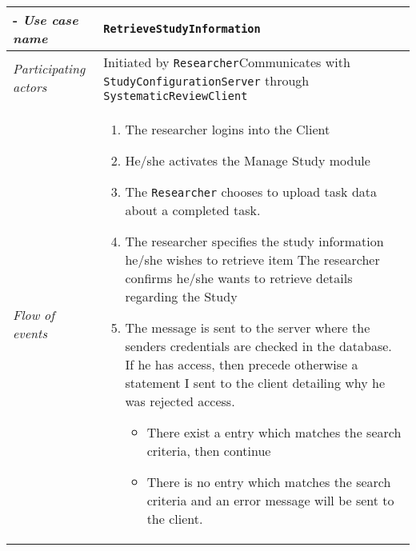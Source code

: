 
%
%
\newcommand{\client}{\texttt{SystematicReviewClient}\xspace}
\newcommand{\server}{\texttt{StudyConfigurationServer}\xspace}
\newcommand{\studyconfigui}{\texttt{StudyConfigurationUI}\xspace}
\newcommand{\teammanagement}{\texttt{Team Management}\xspace}
\newcommand{\researcher}{\texttt{Researcher}\xspace}
\newcommand{\database}{\texttt{Database}\xspace}
\newcommand{\incident}{\texttt{Incident}\xspace}
\newcommand{\RetrieveStudyInformation}{\texttt{RetrieveStudyInformation}\xspace}
\newcommand{\validateuser}{\texttt{ValidateUser}\xspace}


%
%
\begin{table}[h!]
\tabulinesep=1.5mm
\begin{tabu} to 
	\tabucline[1.5pt]-
	\textit{Use case name} & \RetrieveStudyInformation \\
	\hline
	\textit{Participating actors} & Initiated by \researcher \newline Communicates with \server through \client \\
	\hline
	\textit{Flow of events} &
	\vspace{-3mm}
	\begin{enumerate}[leftmargin=*,topsep=0pt,itemsep=-1ex]
		\item The researcher logins into the Client
		\item He/she activates the Manage Study module
		\item The \researcher chooses to upload task data about a completed task.
		\item The researcher specifies the study information he/she wishes to retrieve
		item The researcher confirms he/she wants to retrieve details regarding the Study
		\item The message is sent to the server where the senders credentials are checked in the database. If he has access, then precede otherwise a statement I sent to the client detailing why he was rejected access.
		\begin{itemize} 
			\item There exist a entry which matches the search criteria, then continue 
			\item There is no entry which matches the search criteria and an error message will be sent to the client.
		\end{itemize}
				

\end{enumerate}
\end{tabu}
\end{table}

